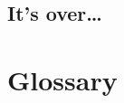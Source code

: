 \documentclass[mscthesis]{usiinfthesis}
\begin{document}
\section{It's over\dots}
\lipsum 

\backmatter

\chapter{Glossary} %

%
%



\lipsum
\end{document}
